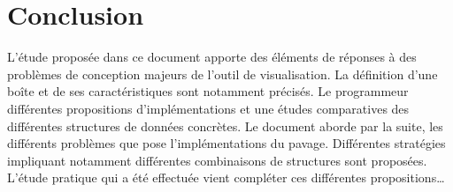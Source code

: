 \chapter{Conclusion}
L'étude proposée dans ce document apporte des éléments de réponses à des problèmes de conception majeurs de l'outil de visualisation. La définition d'une boîte et de ses caractéristiques sont notamment précisés. Le programmeur  différentes propositions d'implémentations et une études comparatives des différentes structures de données concrètes. Le document aborde par la suite, les différents problèmes que pose l'implémentations du pavage. Différentes stratégies impliquant notamment différentes combinaisons de structures sont proposées. L'étude pratique qui a été effectuée vient compléter ces différentes propositions\dots    